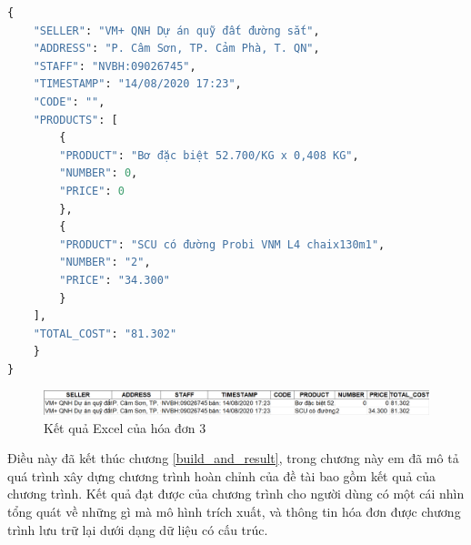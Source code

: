 \begin{lstlisting}[language=Python]
{
    "SELLER": "VM+ QNH Dự án quỹ đất đường sắt",
    "ADDRESS": "P. Câm Sơn, TP. Cảm Phà, T. QN",
    "STAFF": "NVBH:09026745",
    "TIMESTAMP": "14/08/2020 17:23",
    "CODE": "",
    "PRODUCTS": [
        {
        "PRODUCT": "Bơ đặc biệt 52.700/KG x 0,408 KG",
        "NUMBER": 0,
        "PRICE": 0
        },
        {
        "PRODUCT": "SCU có đường Probi VNM L4 chaix130m1",
        "NUMBER": "2",
        "PRICE": "34.300"
        }
    ],
    "TOTAL_COST": "81.302"
    }
}
\end{lstlisting}

\begin{figure}[h]
    \includegraphics[scale=0.314]{images/result-demo-excel-3.png}
    \caption{Kết quả Excel của hóa đơn 3}
\end{figure}

Điều này đã kết thúc chương \ref{build_and_result}, trong chương này em đã mô tả quá trình xây dựng chương trình hoàn chỉnh của đề tài bao gồm kết quả của chương trình. Kết quả đạt được của chương trình cho người dùng có một cái nhìn tổng quát về những gì mà mô hình trích xuất, và thông tin hóa đơn được chương trình lưu trữ lại dưới dạng dữ liệu có cấu trúc. 
